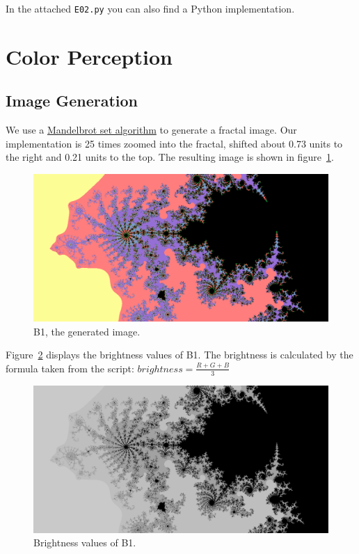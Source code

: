 \documentclass[a4paper,12pt]{article}
\begin{document}
	In the attached \texttt{E02.py} you can also find a Python implementation.
	
	\section{Color Perception}
	
	\subsection{Image Generation}
	
	We use a \href{https://en.wikipedia.org/wiki/Mandelbrot_set}{Mandelbrot set algorithm} to generate a fractal image. Our implementation is 25 times zoomed into the fractal, shifted about 0.73 units to the right and 0.21 units to the top. The resulting image is shown in figure~\ref{fig:b1}.
	
	\begin{figure}[h!]	
		\centering
		\includegraphics[width=.95\textwidth]{B1.png}
		\caption{\label{fig:b1}B1, the generated image.}
	\end{figure}
	
	Figure~\ref{fig:b1bright} displays the brightness values of B1. The brightness is calculated by the formula taken from the script: $\mathit{brightness} = \frac{R + G + B}{3}$
	
	\begin{figure}[h!]	
		\centering
		\includegraphics[width=.95\textwidth]{B1_Brightness.png}
		\caption{\label{fig:b1bright}Brightness values of B1.}
	\end{figure}
	
\end{document}
